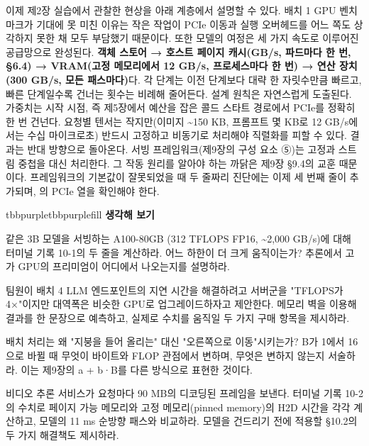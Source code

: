 이제 제2장 실습에서 관찰한 현상을 아래 계층에서 설명할 수 있다. 배치 1 GPU 벤치마크가 기대에 못 미친 이유는 작은 작업이 PCIe 이동과 실행 오버헤드를 어느 쪽도 상각하지 못한 채 모두 부담했기 때문이다. 또한 모델의 여정은 세 가지 속도로 이루어진 공급망으로 완성된다. \textbf{객체 스토어 → 호스트 페이지 캐시(GB/s, 파드마다 한 번, §6.4) → VRAM(고정 메모리에서 12 GB/s, 프로세스마다 한 번) → 연산 장치(300 GB/s, 모든 패스마다)}다. 각 단계는 이전 단계보다 대략 한 자릿수만큼 빠르고, 빠른 단계일수록 건너는 횟수는 비례해 줄어든다. 설계 원칙은 자연스럽게 도출된다. 가중치는 시작 시점, 즉 제5장에서 예산을 잡은 콜드 스타트 경로에서 PCIe를 정확히 한 번 건넌다. 요청별 텐서는 작지만(이미지 \textasciitilde{}150 KB, 프롬프트 몇 KB로 12 GB/s에서는 수십 마이크로초) 반드시 고정하고 비동기로 처리해야 직렬화를 피할 수 있다. 결과는 반대 방향으로 돌아온다. 서빙 프레임워크(제9장의 구성 요소 ⑤)는 고정과 스트림 중첩을 대신 처리한다. 그 작동 원리를 알아야 하는 까닭은 제9장 §9.4의 교훈 때문이다. 프레임워크의 기본값이 잘못되었을 때 두 줄짜리 진단에는 이제 세 번째 줄이 추가되며, 의 PCIe 열을 확인해야 한다.

\begin{calloutbox}{tbbpurple}{tbbpurplefill}
{\normalsize\bfseries\color{tbbpurple}생각해 보기}\par\vspace{3pt}
\begin{tbbitemize}
  \item 같은 3B 모델을 서빙하는 A100-80GB (312 TFLOPS FP16, \textasciitilde{}2,000 GB/s)에 대해 터미널 기록 10-1의 두 줄을 계산하라. 어느 하한이 더 크게 움직이는가? 추론에서 고가 GPU의 프리미엄이 어디에서 나오는지를 설명하라.
  \item 팀원이 배치 4 LLM 엔드포인트의 지연 시간을 해결하려고 서버군을 "TFLOPS가 4×"이지만 대역폭은 비슷한 GPU로 업그레이드하자고 제안한다. 메모리 벽을 이용해 결과를 한 문장으로 예측하고, 실제로 수치를 움직일 두 가지 구매 항목을 제시하라.
  \item 배치 처리는 왜 "지붕을 들어 올리는" 대신 "오른쪽으로 이동"시키는가? B가 1에서 16으로 바뀔 때 무엇이 바이트와 FLOP 관점에서 변하며, 무엇은 변하지 않는지 서술하라. 이는 제9장의 a + b·B를 다른 방식으로 표현한 것이다.
  \item 비디오 추론 서비스가 요청마다 90 MB의 디코딩된 프레임을 보낸다. 터미널 기록 10-2의 수치로 페이지 가능 메모리와 고정 메모리(pinned memory)의 H2D 시간을 각각 계산하고, 모델의 11 ms 순방향 패스와 비교하라. 모델을 건드리기 전에 적용할 §10.2의 두 가지 해결책도 제시하라.
\end{tbbitemize}
\end{calloutbox}

